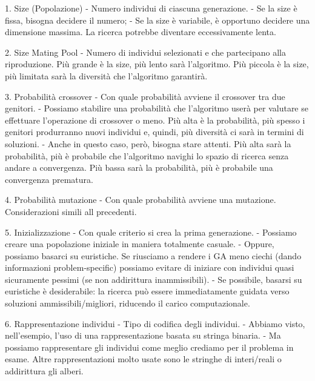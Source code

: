 \documentclass{article}
\begin{document}
    1. Size (Popolazione) - Numero individui di ciascuna generazione.
    - Se la size è fissa, bisogna decidere il numero;
    - Se la size è variabile, è opportuno decidere una dimensione massima. La ricerca potrebbe diventare eccessivamente lenta.


    2. Size Mating Pool - Numero di individui selezionati e che partecipano alla riproduzione.
    Più grande è la size, più lento sarà l’algoritmo. Più piccola è la size, più limitata sarà la diversità che l’algoritmo garantirà.


    3. Probabilità crossover - Con quale probabilità avviene il crossover tra due genitori.
    - Possiamo stabilire una probabilità che l’algoritmo userà per valutare se effettuare l’operazione di crossover o meno. Più alta è la probabilità, più spesso i
    genitori produrranno nuovi individui e, quindi, più diversità ci sarà in termini di soluzioni.
    - Anche in questo caso, però, bisogna stare attenti. Più alta sarà la probabilità, più è probabile che l’algoritmo navighi lo spazio di ricerca senza andare a
    convergenza. Più bassa sarà la probabilità, più è probabile una convergenza prematura.


    4. Probabilità mutazione - Con quale probabilità avviene una mutazione.
    Considerazioni simili all precedenti.


    5. Inizializzazione - Con quale criterio si crea la prima generazione.
    - Possiamo creare una popolazione iniziale in maniera totalmente casuale.
    - Oppure, possiamo basarci su euristiche. Se riusciamo a rendere i GA meno ciechi (dando informazioni problem-specific) possiamo evitare di iniziare con individui
    quasi sicuramente pessimi (se non addirittura inammissibili).
    - Se possibile, basarsi su euristiche è desiderabile: la ricerca può essere immediatamente guidata verso soluzioni ammissibili/migliori, riducendo il carico
    computazionale.


    6. Rappresentazione individui - Tipo di codifica degli individui.
    - Abbiamo visto, nell’esempio, l’uso di una rappresentazione basata su stringa binaria.
    - Ma possiamo rappresentare gli individui come meglio crediamo per il problema in esame.
    Altre rappresentazioni molto usate sono le stringhe di interi/reali o addirittura gli alberi.
\end{document}
